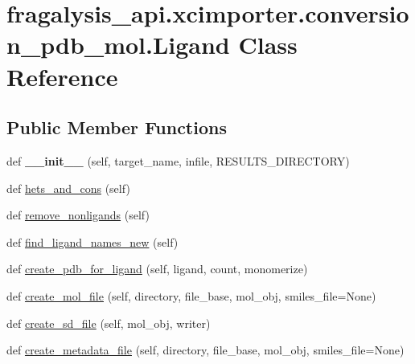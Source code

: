 \hypertarget{classfragalysis__api_1_1xcimporter_1_1conversion__pdb__mol_1_1_ligand}{}\section{fragalysis\+\_\+api.\+xcimporter.\+conversion\+\_\+pdb\+\_\+mol.\+Ligand Class Reference}
\label{classfragalysis__api_1_1xcimporter_1_1conversion__pdb__mol_1_1_ligand}
\subsection*{Public Member Functions}
\begin{DoxyCompactItemize}
\item 
\mbox{\label{classfragalysis__api_1_1xcimporter_1_1conversion__pdb__mol_1_1_ligand_a93d37150b50131f70bb890e6ec609047}} 
def {\bfseries \+\_\+\+\_\+init\+\_\+\+\_\+} (self, target\+\_\+name, infile, R\+E\+S\+U\+L\+T\+S\+\_\+\+D\+I\+R\+E\+C\+T\+O\+RY)
\item 
def \hyperlink{classfragalysis__api_1_1xcimporter_1_1conversion__pdb__mol_1_1_ligand_af0d3d0b75f9f10f0f50cba06017c4ba6}{hets\+\_\+and\+\_\+cons} (self)
\item 
def \hyperlink{classfragalysis__api_1_1xcimporter_1_1conversion__pdb__mol_1_1_ligand_af21865a4bb9be6aab21bfc82668ba25e}{remove\+\_\+nonligands} (self)
\item 
def \hyperlink{classfragalysis__api_1_1xcimporter_1_1conversion__pdb__mol_1_1_ligand_aa9601289368daa83655aa849041e7b63}{find\+\_\+ligand\+\_\+names\+\_\+new} (self)
\item 
def \hyperlink{classfragalysis__api_1_1xcimporter_1_1conversion__pdb__mol_1_1_ligand_a1f1e4e6058646f97f6fba517f187b64c}{create\+\_\+pdb\+\_\+for\+\_\+ligand} (self, ligand, count, monomerize)
\item 
def \hyperlink{classfragalysis__api_1_1xcimporter_1_1conversion__pdb__mol_1_1_ligand_a811498c568a5f12e8047ced3640a3c90}{create\+\_\+mol\+\_\+file} (self, directory, file\+\_\+base, mol\+\_\+obj, smiles\+\_\+file=None)
\item 
def \hyperlink{classfragalysis__api_1_1xcimporter_1_1conversion__pdb__mol_1_1_ligand_a9985de5dae739f11768aa6985ccd94bd}{create\+\_\+sd\+\_\+file} (self, mol\+\_\+obj, writer)
\item 
def \hyperlink{classfragalysis__api_1_1xcimporter_1_1conversion__pdb__mol_1_1_ligand_a58df3b55a6aca35511598a8d0e25ed6d}{create\+\_\+metadata\+\_\+file} (self, directory, file\+\_\+base, mol\+\_\+obj, smiles\+\_\+file=None)
\end{DoxyCompactItemize}
